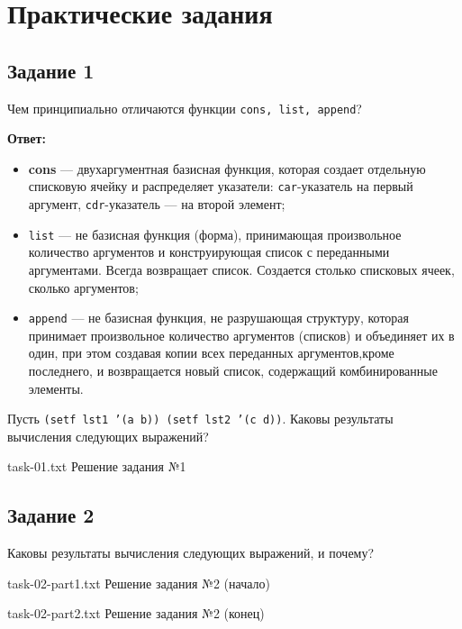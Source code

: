 \chapter{Практические задания}

\section{Задание 1}

Чем принципиально отличаются функции \texttt{cons, list, append}?

\textbf{Ответ:} 

\begin{itemize}[label*=--]
	\item \textbf{cons} --- двухаргументная базисная функция, которая создает отдельную списковую ячейку и распределяет указатели: \texttt{car}-указатель на первый аргумент, \texttt{cdr}-указатель --- на второй элемент;
	\item \texttt{list} --- не базисная функция (форма), принимающая произвольное количество аргументов и конструирующая список с переданными аргументами. Всегда возвращает список. Создается столько списковых ячеек, сколько аргументов;
	\item \texttt{append} --- не базисная функция, не разрушающая структуру, которая принимает произвольное количество аргументов (списков) и объединяет их в один, при этом создавая копии всех переданных аргументов,кроме последнего, и возвращается новый список, содержащий комбинированные элементы.
\end{itemize}

Пусть \texttt{(setf lst1 '(a b)) (setf lst2 '(c d))}.
Каковы результаты вычисления следующих выражений?

{task-01.txt} %
{Решение задания №1} %


\section{Задание 2}

Каковы результаты вычисления следующих выражений, и почему?

{task-02-part1.txt} %
{Решение задания №2 (начало)} %

{task-02-part2.txt} %
{Решение задания №2 (конец)} %


